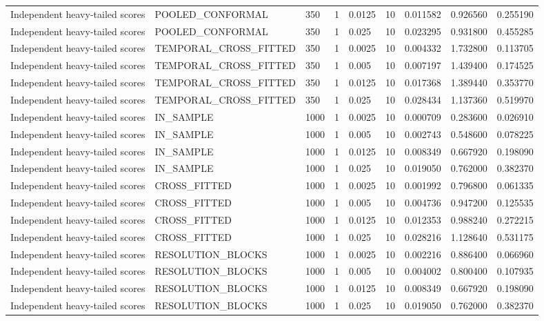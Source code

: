 \begin{tabular}{lllllllll}
Independent heavy-tailed scores & POOLED\_CONFORMAL & 350 & 1 & 0.0125 & 10 & 0.011582 & 0.926560 & 0.255190 \\
Independent heavy-tailed scores & POOLED\_CONFORMAL & 350 & 1 & 0.025 & 10 & 0.023295 & 0.931800 & 0.455285 \\
Independent heavy-tailed scores & TEMPORAL\_CROSS\_FITTED & 350 & 1 & 0.0025 & 10 & 0.004332 & 1.732800 & 0.113705 \\
Independent heavy-tailed scores & TEMPORAL\_CROSS\_FITTED & 350 & 1 & 0.005 & 10 & 0.007197 & 1.439400 & 0.174525 \\
Independent heavy-tailed scores & TEMPORAL\_CROSS\_FITTED & 350 & 1 & 0.0125 & 10 & 0.017368 & 1.389440 & 0.353770 \\
Independent heavy-tailed scores & TEMPORAL\_CROSS\_FITTED & 350 & 1 & 0.025 & 10 & 0.028434 & 1.137360 & 0.519970 \\
Independent heavy-tailed scores & IN\_SAMPLE & 1000 & 1 & 0.0025 & 10 & 0.000709 & 0.283600 & 0.026910 \\
Independent heavy-tailed scores & IN\_SAMPLE & 1000 & 1 & 0.005 & 10 & 0.002743 & 0.548600 & 0.078225 \\
Independent heavy-tailed scores & IN\_SAMPLE & 1000 & 1 & 0.0125 & 10 & 0.008349 & 0.667920 & 0.198090 \\
Independent heavy-tailed scores & IN\_SAMPLE & 1000 & 1 & 0.025 & 10 & 0.019050 & 0.762000 & 0.382370 \\
Independent heavy-tailed scores & CROSS\_FITTED & 1000 & 1 & 0.0025 & 10 & 0.001992 & 0.796800 & 0.061335 \\
Independent heavy-tailed scores & CROSS\_FITTED & 1000 & 1 & 0.005 & 10 & 0.004736 & 0.947200 & 0.125535 \\
Independent heavy-tailed scores & CROSS\_FITTED & 1000 & 1 & 0.0125 & 10 & 0.012353 & 0.988240 & 0.272215 \\
Independent heavy-tailed scores & CROSS\_FITTED & 1000 & 1 & 0.025 & 10 & 0.028216 & 1.128640 & 0.531175 \\
Independent heavy-tailed scores & RESOLUTION\_BLOCKS & 1000 & 1 & 0.0025 & 10 & 0.002216 & 0.886400 & 0.066960 \\
Independent heavy-tailed scores & RESOLUTION\_BLOCKS & 1000 & 1 & 0.005 & 10 & 0.004002 & 0.800400 & 0.107935 \\
Independent heavy-tailed scores & RESOLUTION\_BLOCKS & 1000 & 1 & 0.0125 & 10 & 0.008349 & 0.667920 & 0.198090 \\
Independent heavy-tailed scores & RESOLUTION\_BLOCKS & 1000 & 1 & 0.025 & 10 & 0.019050 & 0.762000 & 0.382370 \\

\end{tabular}
